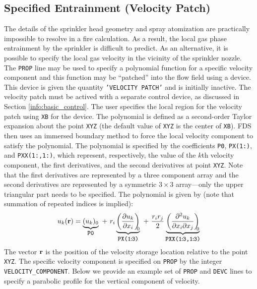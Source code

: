 \documentclass[11pt]{book}
\newcommand{\ct}{\tt\small}
\begin{document}
\subsection{Specified Entrainment (Velocity Patch)}
\label{info:velocity_patch}

The details of the sprinkler head geometry and spray atomization are practically impossible to resolve in a fire calculation.  As a result, the local gas phase entrainment by the sprinkler is difficult to predict.  As an alternative, it is possible to specify the local gas velocity in the vicinity of the sprinkler nozzle.  The {\ct PROP} line may be used to specify a polynomial function for a specific velocity component and this function may be ``patched'' into the flow field using a device.  This device is given the quantity {\ct 'VELOCITY PATCH'} and is initially inactive.  The velocity patch must be actived with a separate control device, as discussed in Section \ref{info:basic_control}.  The user specifies the local region for the velocity patch using {\ct XB} for the device.  The polynomial is defined as a second-order Taylor expansion about the point {\ct XYZ} (the default value of {\ct XYZ} is the center of {\ct XB}).  FDS then uses an immersed boundary method to force the local velocity component to satisfy the polynomial.  The polynomial is specified by the coefficients {\ct P0}, {\ct PX(1\!:)}, and {\ct PXX(1\!:,1\!:)}, which represent, respectively, the value of the $k$th velocity component, the first derivatives, and the second derivatives at point {\ct XYZ}.  Note that the first derivatives are represented by a three component array and the second derivatives are represented by a symmetric $3 \times 3$ array---only the upper triangular part needs to be specified.  The polynomial is given by (note that summation of repeated indices is implied):
\begin{equation}
u_k(\mathbf{r}) = \underbrace{(u_k)_0}_{\mbox{\ct P0}} \,\,+\,\, r_i \underbrace{\left( \frac{\partial u_k}{\partial x_i} \right)_{\!\!\!0}}_{\mbox{\ct PX(1\!:\!3)}} \,\,+\,\,\frac{ r_i r_j}{2} \underbrace{\left(\frac{\partial^2 u_k}{\partial x_i \partial x_j}\right)_{\!\!\!0}}_{\mbox{\ct PXX(1\!:\!3,1\!:\!3)}}
\end{equation}
The vector ${\bf r}$ is the position of the velocity storage location relative to the point {\ct XYZ}.  The specific velocity component is specified on {\ct PROP} by the integer {\ct VELOCITY\_COMPONENT}.  Below we provide an example set of {\ct PROP} and {\ct DEVC} lines to specify a parabolic profile for the vertical component of velocity.
\end{document}
